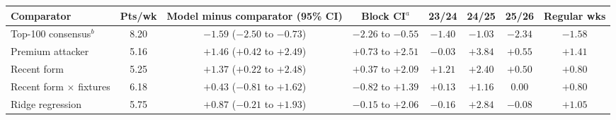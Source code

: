 \begin{tabular}{lccccccc}
\toprule
Comparator & Pts/wk & Model minus comparator (95\% CI) & Block CI$^a$ & 23/24 & 24/25 & 25/26 & Regular wks \\
\midrule
Top-100 consensus$^b$ & 8.20 & $-1.59$ ($-2.50$ to $-0.73$) & $-2.26$ to $-0.55$ & $-1.40$ & $-1.03$ & $-2.34$ & $-1.58$ \\
Premium attacker & 5.16 & $+1.46$ ($+0.42$ to $+2.49$) & $+0.73$ to $+2.51$ & $-0.03$ & $+3.84$ & $+0.55$ & $+1.41$ \\
Recent form & 5.25 & $+1.37$ ($+0.22$ to $+2.48$) & $+0.37$ to $+2.09$ & $+1.21$ & $+2.40$ & $+0.50$ & $+0.80$ \\
Recent form $\times$ fixtures & 6.18 & $+0.43$ ($-0.81$ to $+1.62$) & $-0.82$ to $+1.39$ & $+0.13$ & $+1.16$ & $0.00$ & $+0.80$ \\
Ridge regression & 5.75 & $+0.87$ ($-0.21$ to $+1.93$) & $-0.15$ to $+2.06$ & $-0.16$ & $+2.84$ & $-0.08$ & $+1.05$ \\
\bottomrule
\end{tabular}
